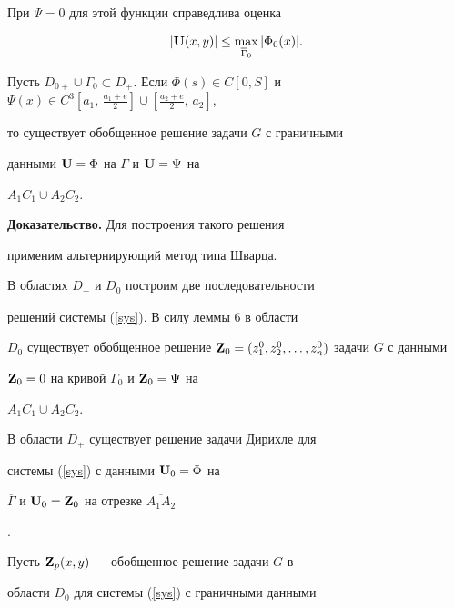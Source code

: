 При $\Psi =0$ для этой функции справедлива оценка


\begin{equation}\label{G0}


|{\bold U}(x,y)|\le \max_{\overline \Gamma_0}|\Phi_{0}(x)|.


\end{equation}





\begin{lem}


Пусть $D_{0+}\cup \Gamma


_0\subset D_+$. Если $\Phi(s)\in C[0,S]$ и $\Psi(x)\in


C^3[a_1,\,\frac{a_1+e}{2}]\cup [\frac{a_2+e}{2},\,a_2]$,


то существует обобщенное решение задачи $G$ с граничными


данными ${\bold U}=\Phi$ на $\Gamma$ и ${\bold U}=\Psi$ на


$A_1C_1\cup A_2C_2$.


\end{lem}





{\bf Доказательство.} Для построения такого решения


применим альтернирующий метод типа Шварца.


В областях $D_+$ и $D_0$ построим две последовательности


решений системы (\ref{sys}). В силу леммы 6 в области


$D_0$ существует обобщенное решение ${\bold


Z}_0=(z_1^0,z_2^0,\dotsc,z_n^0)$ задачи $G$ с данными


${\bold Z}_0=0$ на кривой $\Gamma_0$ и ${\bold Z}_0=\Psi$ на


$A_1C_1\cup A_2C_2$.





В области $D_+$ существует решение задачи Дирихле для


системы (\ref{sys}) с данными ${\bold U}_0=\Phi$ на


$\overline


\Gamma $ и ${\bold U}_0={\bold Z}_0$ на отрезке $\overline {A_1A_2}$


\cite{Bitz}.


Пусть ${\bold Z}_p(x,y)$ --- обобщенное решение задачи $G$ в


области $D_0$ для системы (\ref{sys}) с граничными данными



